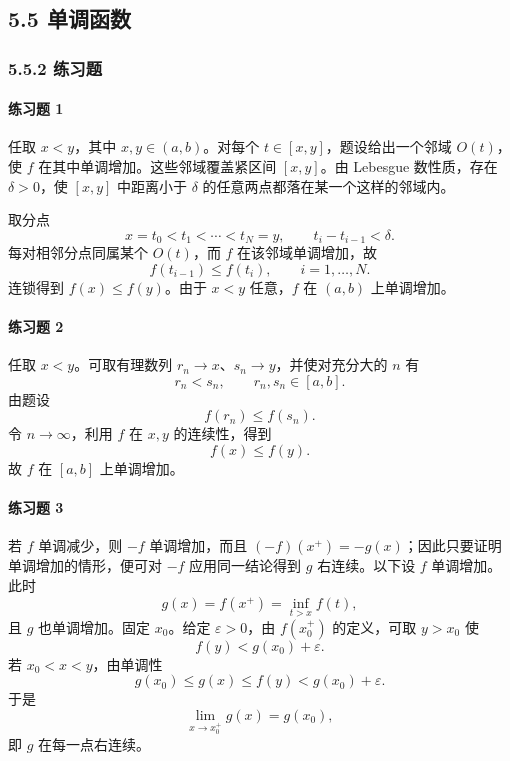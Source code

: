 \subsection*{5.5 单调函数}

\subsubsection*{5.5.2 练习题}

\paragraph{练习题 1}
\begin{xsolution}
任取 $x<y$，其中 $x,y\in(a,b)$。对每个 $t\in[x,y]$，题设给出一个邻域 $O(t)$，使 $f$ 在其中单调增加。这些邻域覆盖紧区间 $[x,y]$。由 Lebesgue 数性质，存在 $\delta>0$，使 $[x,y]$ 中距离小于 $\delta$ 的任意两点都落在某一个这样的邻域内。

取分点
\[
 x=t_0<t_1<\cdots<t_N=y,
 \qquad t_i-t_{i-1}<\delta.
\]
每对相邻分点同属某个 $O(t)$，而 $f$ 在该邻域单调增加，故
\[
 f(t_{i-1})\le f(t_i),\qquad i=1,\ldots,N.
\]
连锁得到 $f(x)\le f(y)$。由于 $x<y$ 任意，$f$ 在 $(a,b)$ 上单调增加。
\end{xsolution}

\paragraph{练习题 2}
\begin{xsolution}
任取 $x<y$。可取有理数列 $r_n\to x$、$s_n\to y$，并使对充分大的 $n$ 有
\[
 r_n<s_n,
 \qquad r_n,s_n\in[a,b].
\]
由题设
\[
 f(r_n)\le f(s_n).
\]
令 $n\to\infty$，利用 $f$ 在 $x,y$ 的连续性，得到
\[
 f(x)\le f(y).
\]
故 $f$ 在 $[a,b]$ 上单调增加。
\end{xsolution}

\paragraph{练习题 3}
\begin{xsolution}
若 $f$ 单调减少，则 $-f$ 单调增加，而且 $(-f)(x^+)=-g(x)$；因此只要证明单调增加的情形，便可对 $-f$ 应用同一结论得到 $g$ 右连续。以下设 $f$ 单调增加。此时
\[
 g(x)=f(x^+)=\inf_{t>x}f(t),
\]
且 $g$ 也单调增加。固定 $x_0$。给定 $\varepsilon>0$，由 $f(x_0^+)$ 的定义，可取 $y>x_0$ 使
\[
 f(y)<g(x_0)+\varepsilon.
\]
若 $x_0<x<y$，由单调性
\[
 g(x_0)\le g(x)\le f(y)<g(x_0)+\varepsilon.
\]
于是
\[
 \lim_{x\to x_0^+}g(x)=g(x_0),
\]
即 $g$ 在每一点右连续。
\end{xsolution}

